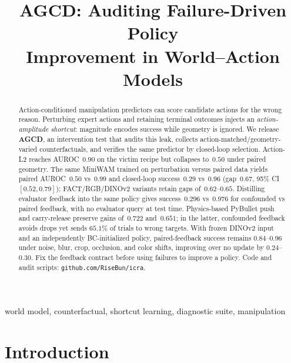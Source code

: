 \documentclass[conference]{IEEEtran}
\begin{document}
\title{AGCD: Auditing Failure-Driven Policy\\
Improvement in World--Action Models}

\author{
}

\maketitle


\begin{abstract}
Action-conditioned manipulation predictors can score candidate actions for the
wrong reason. Perturbing expert actions and retaining terminal outcomes injects
an \textit{action-amplitude shortcut}: magnitude encodes success while geometry
is ignored. We release \textbf{AGCD}, an intervention test that audits this
leak, collects action-matched/geometry-varied counterfactuals, and verifies the
same predictor by closed-loop selection. Action-L2 reaches AUROC~$0.90$ on the
victim recipe but collapses to~$0.50$ under paired geometry. The same MiniWAM
trained on perturbation versus paired data yields paired AUROC~$0.50$ vs~$0.99$
and closed-loop success~$0.29$ vs~$0.96$ (gap~$0.67$, 95\% CI~$[0.52,0.79]$);
FACT/RGB/DINOv2 variants retain gaps of~$0.62$--$0.65$. Distilling
evaluator feedback into the same policy gives success~$0.296$ vs~$0.976$ for
confounded vs paired feedback, with no evaluator query at test time. Physics-based
PyBullet push and carry-release preserve gains of~$0.722$ and~$0.651$; in the
latter, confounded feedback avoids drops yet sends $65.1\%$ of trials to wrong
targets. With frozen DINOv2 input and an independently BC-initialized policy,
paired-feedback success remains $0.84$--$0.96$ under noise, blur, crop,
occlusion, and color shifts, improving over no update by $0.24$--$0.30$. Fix the
feedback contract before using failures to improve a policy.
Code and audit scripts: \texttt{github.com/RiseBun/icra}.
\end{abstract}

\begin{IEEEkeywords}
world model, counterfactual, shortcut learning, diagnostic suite, manipulation
\end{IEEEkeywords}



\section{Introduction}
\label{sec:intro}
\end{document}
